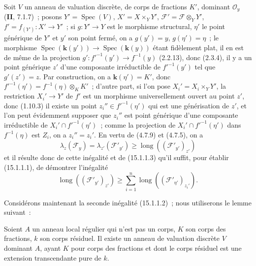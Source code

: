 Soit $V$ un anneau de valuation discrète, de corps de fractions $K'$, dominant
$\mathcal O_y$ (\textbf{II}, 7.1.7)~; posons $Y'=\operatorname{Spec}(V)$,
$X'=X\times_Y Y'$, $\mathcal F'=\mathcal F\otimes_Y Y'$,
$f'=f_{(Y')}:X'\to Y'$~; si $g:Y'\to Y$ est le morphisme structural, $\eta'$ le
point générique de $Y'$ et $y'$ son point fermé, on a $g(y')=y$, $g(\eta')=\eta$~;
le morphisme $\operatorname{Spec}(\mathbf{k}(y'))\to
\operatorname{Spec}(\mathbf{k}(y))$ étant fidèlement plat, il en est de même de
la projection $g':f'^{-1}(y')\to f^{-1}(y)$ (2.2.13), donc (2.3.4), il y a un
point générique $z'$ d'une composante irréductible de $f'^{-1}(y')$ tel que
$g'(z')=z$. Par construction, on a $\mathbf{k}(\eta')=K'$, donc
$f'^{-1}(\eta')=f^{-1}(\eta)\otimes_K K'$~; d'autre part, si l'on pose
$X_i'=X_i\times_Y Y'$, la restriction $X_i'\to Y'$ de $f'$ est un morphisme
universellement ouvert au point $z'$, donc (1.10.3) il existe un point
$z_i''\in f'^{-1}(\eta')$ qui est une générisation de $z'$, et l'on peut
évidemment supposer que $z_i''$ est point générique d'une composante
irréductible de $X_i'\cap f'^{-1}(\eta')$~; comme la projection de
$X_i'\cap f'^{-1}(\eta')$ dans $f^{-1}(\eta)$ est $Z_i$, on a $z_i''=z_i'$.
En vertu de (4.7.9) et (4.7.5), on a
\[
\tag{15.1.1.4}
\label{IV.15.1.1.4-fr}
  \lambda_z(\mathcal F_y)=\lambda_{z'}(\mathcal F'_{y'})
  \geqslant\operatorname{long}((\mathcal F'_{y'})_{z'})
\]
et il résulte donc de cette inégalité et de (15.1.1.3) qu'il suffit, pour établir
(15.1.1.1), de démontrer l'inégalité
\[
\tag{15.1.1.5}
\label{IV.15.1.1.5-fr}
  \operatorname{long}((\mathcal F'_{y'})_{z'})\geqslant
  \sum_{i=1}^{n}\operatorname{long}((\mathcal F'_{\eta'})_{z_i'}).
\]

Considérons maintenant la seconde inégalité (15.1.1.2)~; nous utiliserons le
lemme suivant~:

\begin{lemma}[15.1.1.6]
\label{IV.15.1.1.6-fr}
Soient $A$ un anneau local régulier qui n'est pas un corps, $K$ son corps des
fractions, $k$ son corps résiduel. Il existe un anneau de valuation discrète $V$
dominant $A$, ayant $K$ pour corps des fractions et dont le corps résiduel est
une extension transcendante pure de $k$.
\end{lemma}

